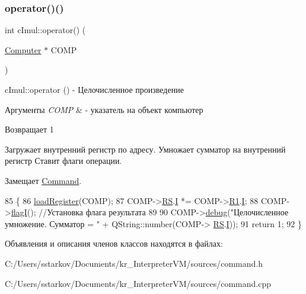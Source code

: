 \subsubsection{\texorpdfstring{operator()()}{operator()()}}
{\footnotesize\ttfamily int c\+Imul\+::operator() (\begin{DoxyParamCaption}\item[{\hyperlink{class_computer}{Computer} $\ast$}]{C\+O\+MP }\end{DoxyParamCaption})\hspace{0.3cm}{\ttfamily [virtual]}}



c\+Imul\+::operator () -\/ Целочисленное произведение 


\begin{DoxyParams}{Аргументы}
{\em C\+O\+MP} & -\/ указатель на объект компьютер \\
\hline
\end{DoxyParams}
\begin{DoxyReturn}{Возвращает}
1
\end{DoxyReturn}
Загружает внутренний регистр по адресу. Умножает сумматор на внутренний регистр Ставит флаги операции. 

Замещает \hyperlink{class_command_a79939b66f3de892e91d7710844294716}{Command}.


\begin{DoxyCode}
85 \{
86     \hyperlink{class_command_aac6f368e7c9dbb357b3f00627d5dabfc}{loadRegister}(COMP);
87     COMP->\hyperlink{class_computer_a874503110664b3cf821118d2ce9c2b96}{RS}.\hyperlink{union_computer_1_1data_a6e51de6e0351adc4e50b336a092bc4bb}{I} *= COMP->\hyperlink{class_computer_a0fbf84599b7db9d634a92afed443ee73}{R1}.\hyperlink{union_computer_1_1data_a6e51de6e0351adc4e50b336a092bc4bb}{I};
88     COMP->\hyperlink{class_computer_aae4a76a8a03a6c9fb1c12968d629be3e}{flagI}(); \textcolor{comment}{//Установка флага результата}
89 
90     COMP->\hyperlink{class_computer_a10ca6c6b200630119201de16d7368e0f}{debug}(\textcolor{stringliteral}{"Целочисленное умножение. Сумматор = "} + QString::number(COMP->
      \hyperlink{class_computer_a874503110664b3cf821118d2ce9c2b96}{RS}.\hyperlink{union_computer_1_1data_a6e51de6e0351adc4e50b336a092bc4bb}{I}));
91     \textcolor{keywordflow}{return} 1;
92 \}
\end{DoxyCode}


Объявления и описания членов классов находятся в файлах\+:\begin{DoxyCompactItemize}
\item 
C\+:/\+Users/sstarkov/\+Documents/kr\+\_\+\+Interpreter\+V\+M/sources/command.\+h\item 
C\+:/\+Users/sstarkov/\+Documents/kr\+\_\+\+Interpreter\+V\+M/sources/command.\+cpp\end{DoxyCompactItemize}
